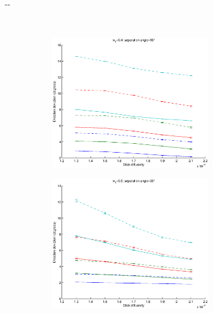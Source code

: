 \documentclass{article}
\begin{document}
\begin{figure}[H]
\begin{adjustwidth}{-\oddsidemargin}{-\rightmargin}
\begin{subfigure}{0.8\paperwidth}
      ~
      \begin{subfigure}{0.3\textwidth}
        \centering
        \includegraphics[width=\textwidth]{figures/synth_modbas_diffus__snr=20__w1=4__angle=90.eps}
      \end{subfigure}
    \end{subfigure}
    \begin{subfigure}{0.8\paperwidth}
      \begin{subfigure}{0.3\textwidth}
        \centering
        \includegraphics[width=\textwidth]{figures/synth_modbas_diffus__snr=20__w1=5__angle=30.eps}

\end{subfigure}
\end{subfigure}
\end{adjustwidth}
\end{figure}
\end{document}
